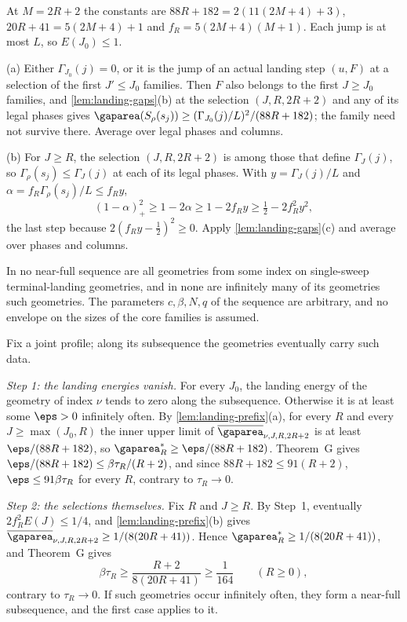 \begin{outline}
At $M=2R+2$ the constants are $88R+182=2(11(2M+4)+3)$, $20R+41=5(2M+4)+1$ and
$f_R=5(2M+4)(M+1)$. Each jump is at most $L$, so $E(J_0)\le1$.

(a) Either $\Gamma_{J_0}(j)=0$, or it is the jump of an actual landing step $(u,F)$ at
a selection of the first $J'\le J_0$ families. Then $F$ also belongs to the first
$J\ge J_0$ families, and \cref{lem:landing-gaps}(b) at the selection $(J,R,2R+2)$ and
any of its legal phases gives
$\gaparea(S_\rho(s_j))\ge(\Gamma_{J_0}(j)/L)^2/(88R+182)$; the family need not survive
there. Average over legal phases and columns.

(b) For $J\ge R$, the selection $(J,R,2R+2)$ is among those that define
$\Gamma_J(j)$, so $\Gamma_\rho(s_j)\le\Gamma_J(j)$ at each of its legal phases. With
$y=\Gamma_J(j)/L$ and $\alpha=f_R\Gamma_\rho(s_j)/L\le f_Ry$,
\[
 (1-\alpha)_+^2\ge1-2\alpha\ge1-2f_Ry\ge\tfrac12-2f_R^2y^2,
\]
the last step because $2(f_Ry-\tfrac12)^2\ge0$. Apply \cref{lem:landing-gaps}(c) and
average over phases and columns.
\end{outline}

\begin{theorem}\label{thm:terminal-landings}
In no near-full sequence are all geometries from some index on single-sweep
terminal-landing geometries, and in none are infinitely many of its geometries such
geometries. The parameters $c,\beta,N,q$ of the sequence are arbitrary, and no envelope
on the sizes of the core families is assumed.
\end{theorem}

\begin{outline}
Fix a joint profile; along its subsequence the geometries eventually carry such data.

\emph{Step 1: the landing energies vanish.} For every $J_0$, the landing energy of the
geometry of index $\nu$ tends to zero along the subsequence. Otherwise it is at least
some $\eps>0$ infinitely often. By \cref{lem:landing-prefix}(a), for every $R$ and
every $J\ge\max(J_0,R)$ the inner upper limit of $\meanarea_{\nu,J,R,2R+2}$ is at least
$\eps/(88R+182)$, so $\limarea_R\ge\eps/(88R+182)$. Theorem~G gives
$\eps/(88R+182)\le\beta\tau_R/(R+2)$, and since $88R+182\le91(R+2)$, $\eps\le91\beta\tau_R$
for every $R$, contrary to $\tau_R\to0$.

\emph{Step 2: the selections themselves.} Fix $R$ and $J\ge R$. By Step~1, eventually
$2f_R^2E(J)\le1/4$, and \cref{lem:landing-prefix}(b) gives
$\meanarea_{\nu,J,R,2R+2}\ge1/(8(20R+41))$. Hence $\limarea_R\ge1/(8(20R+41))$, and
Theorem~G gives
\[
 \beta\tau_R\ge\frac{R+2}{8(20R+41)}\ge\frac1{164}\qquad(R\ge0),
\]
contrary to $\tau_R\to0$. If such geometries occur infinitely often, they form a
near-full subsequence, and the first case applies to it.
\end{outline}


